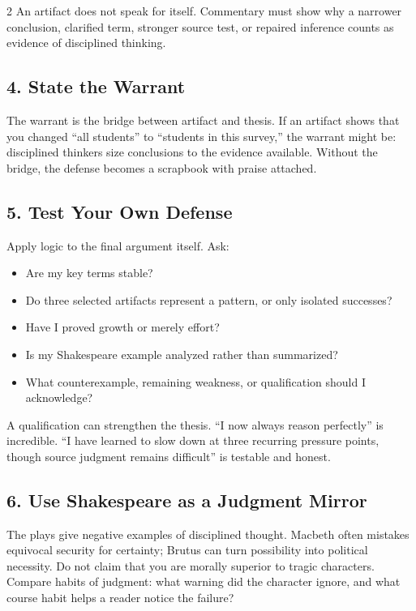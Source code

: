 \documentclass[12pt]{article}
\begin{document}
\begin{multicols}{2}
An artifact does not speak for itself. Commentary must show why a narrower conclusion, clarified term, stronger source test, or repaired inference counts as evidence of disciplined thinking.

\subsection*{4. State the Warrant}
The warrant is the bridge between artifact and thesis. If an artifact shows that you changed ``all students'' to ``students in this survey,'' the warrant might be: disciplined thinkers size conclusions to the evidence available. Without the bridge, the defense becomes a scrapbook with praise attached.

\subsection*{5. Test Your Own Defense}
Apply logic to the final argument itself. Ask:

\begin{itemize}[leftmargin=*]
\item Are my key terms stable?
\item Do three selected artifacts represent a pattern, or only isolated successes?
\item Have I proved growth or merely effort?
\item Is my Shakespeare example analyzed rather than summarized?
\item What counterexample, remaining weakness, or qualification should I acknowledge?
\end{itemize}

A qualification can strengthen the thesis. ``I now always reason perfectly'' is incredible. ``I have learned to slow down at three recurring pressure points, though source judgment remains difficult'' is testable and honest.

\subsection*{6. Use Shakespeare as a Judgment Mirror}
The plays give negative examples of disciplined thought. Macbeth often mistakes equivocal security for certainty; Brutus can turn possibility into political necessity. Do not claim that you are morally superior to tragic characters. Compare habits of judgment: what warning did the character ignore, and what course habit helps a reader notice the failure?


\end{multicols}
\end{document}
